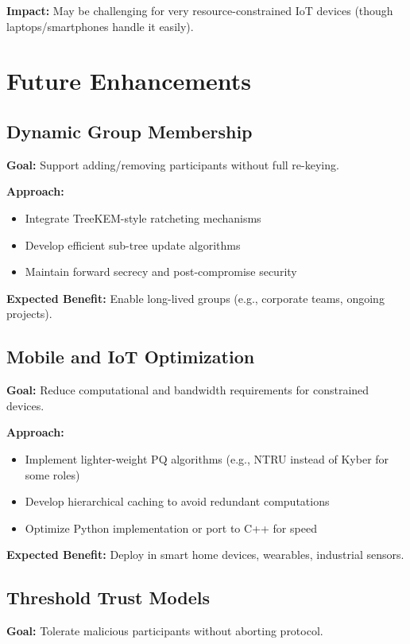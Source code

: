 \documentclass[12pt,a4paper]{report}
\begin{document}
\textbf{Impact:} May be challenging for very resource-constrained IoT devices (though laptops/smartphones handle it easily).

\section{Future Enhancements}

\subsection{Dynamic Group Membership}

\textbf{Goal:} Support adding/removing participants without full re-keying.

\textbf{Approach:}
\begin{itemize}
\item Integrate TreeKEM-style ratcheting mechanisms
\item Develop efficient sub-tree update algorithms
\item Maintain forward secrecy and post-compromise security
\end{itemize}

\textbf{Expected Benefit:} Enable long-lived groups (e.g., corporate teams, ongoing projects).

\subsection{Mobile and IoT Optimization}

\textbf{Goal:} Reduce computational and bandwidth requirements for constrained devices.

\textbf{Approach:}
\begin{itemize}
\item Implement lighter-weight PQ algorithms (e.g., NTRU instead of Kyber for some roles)
\item Develop hierarchical caching to avoid redundant computations
\item Optimize Python implementation or port to C++ for speed
\end{itemize}

\textbf{Expected Benefit:} Deploy in smart home devices, wearables, industrial sensors.

\subsection{Threshold Trust Models}

\textbf{Goal:} Tolerate malicious participants without aborting protocol.
\end{document}
